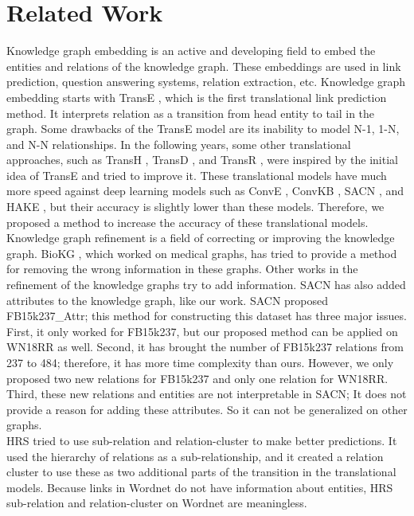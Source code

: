 \documentclass{article} \usepackage{iclr2022_conference,times}
\begin{document}
\section{Related Work}
Knowledge graph embedding is an active and developing field to embed the entities and relations of the knowledge graph. These embeddings are used in link prediction, question answering systems, relation extraction, etc. Knowledge graph embedding starts with TransE \citep{bordes2013translating}, which is the first translational link prediction method. It interprets relation as a transition from head entity to tail in the graph. Some drawbacks of the TransE model are its inability to model N-1, 1-N, and N-N relationships. In the following years, some other translational approaches, such as TransH \citep{transh}, TransD \citep{ji2015knowledge}, and TransR \citep{lin2015learning}, were inspired by the initial idea of TransE \citep{bordes2013translating} and tried to improve it. These translational models have much more speed against deep learning models such as ConvE \citep{conve}, ConvKB \citep{convkb}, SACN \citep{sacn_paper}, and HAKE \citep{zhang2020learning}, but their accuracy is slightly lower than these models. Therefore, we proposed a method to increase the accuracy of these translational models.
\\
\indent
Knowledge graph refinement is a field of correcting or improving the knowledge graph. BioKG \citep{zhao2020biomedical}, which worked on medical graphs, has tried to provide a method for removing the wrong information in these graphs. Other works in the refinement of the knowledge graphs try to add information. SACN \citep{sacn_paper} has also added attributes to the knowledge graph, like our work. SACN proposed FB15k237\_Attr; this method for constructing this dataset has three major issues. First, it only worked for FB15k237, but our proposed method can be applied on WN18RR as well. Second, it has brought the number of FB15k237 relations from 237 to 484; therefore, it has more time complexity than ours. However, we only proposed two new relations for FB15k237 and only one relation for WN18RR. Third, these new relations and entities are not interpretable in SACN; It does not provide a reason for adding these attributes. So it can not be generalized on other graphs. \\
\indent
HRS \citep{zhang2018knowledge} tried to use sub-relation and relation-cluster to make better predictions. It used the hierarchy of relations as a sub-relationship, and it created a relation cluster to use these as two additional parts of the transition in the translational models. Because links in Wordnet do not have information about entities, HRS sub-relation and relation-cluster on Wordnet are meaningless.
\end{document}
